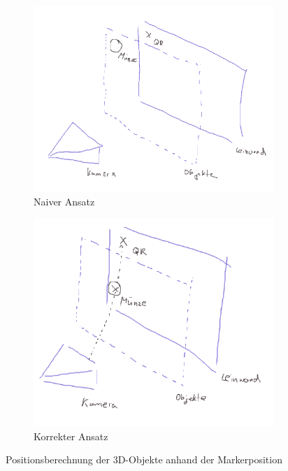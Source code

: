 \begin{figure}[!h]
  \centering
    \begin{subfigure}{0.42\textwidth}
      \centering
        \includegraphics[width=\textwidth]{position_skizze_falsch}
      \caption{Naiver Ansatz}
    \end{subfigure}%
    \begin{subfigure}{0.42\textwidth}
      \centering
        \includegraphics[width=\textwidth]{position_skizze_richtig}
      \caption{Korrekter Ansatz}
    \end{subfigure}
    \caption{Positionsberechnung der 3D-Objekte anhand der Markerposition}
    \label{fig:position_sketch}
\end{figure}

